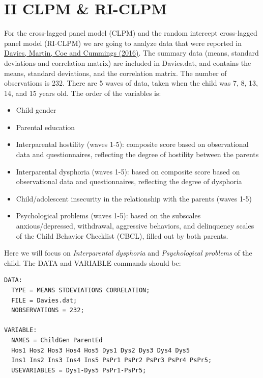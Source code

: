 \documentclass[
]{book}
\providecommand{\tightlist}{%
  \setlength{\itemsep}{0pt}\setlength{\parskip}{0pt}}
\begin{document}
\hypertarget{ii-clpm-ri-clpm}{%
\section*{II CLPM \& RI-CLPM}\label{ii-clpm-ri-clpm}}

For the cross-lagged panel model (CLPM) and the random intercept cross-lagged panel model (RI-CLPM) we are going to analyze data that were reported in \href{10.1017/S0954579416000237}{Davies, Martin, Coe and Cummings (2016)}. The summary data (means, standard deviations and correlation matrix) are included in Davies.dat, and contains the means, standard deviations, and the correlation matrix. The number of observations is 232. There are 5 waves of data, taken when the child was 7, 8, 13, 14, and 15 years old. The order of the variables is:

\begin{itemize}
\tightlist
\item
  Child gender
\item
  Parental education
\item
  Interparental hostility (waves 1-5): composite score based on observational data and questionnaires, reflecting the degree of hostility between the parents
\item
  Interparental dysphoria (waves 1-5): based on composite score based on observational data and questionnaires, reflecting the degree of dysphoria
\item
  Child/adolescent insecurity in the relationship with the parents (waves 1-5)
\item
  Psychological problems (waves 1-5): based on the subscales anxious/depressed, withdrawal, aggressive behaviors, and delinquency scales of the Child Behavior Checklist (CBCL), filled out by both parents.
\end{itemize}

Here we will focus on \emph{Interparental dysphoria} and \emph{Psychological problems} of the child. The DATA and VARIABLE commands should be:

\begin{verbatim}
DATA: 
  TYPE = MEANS STDEVIATIONS CORRELATION;
  FILE = Davies.dat;
  NOBSERVATIONS = 232;

VARIABLE: 
  NAMES = ChildGen ParentEd
  Hos1 Hos2 Hos3 Hos4 Hos5 Dys1 Dys2 Dys3 Dys4 Dys5
  Ins1 Ins2 Ins3 Ins4 Ins5 PsPr1 PsPr2 PsPr3 PsPr4 PsPr5;
  USEVARIABLES = Dys1-Dys5 PsPr1-PsPr5;
\end{verbatim}
\end{document}
